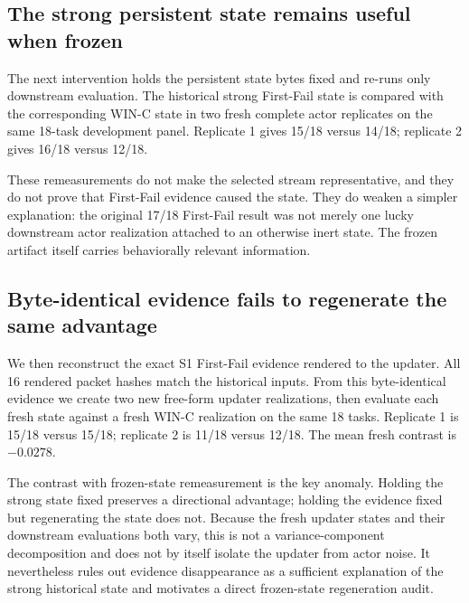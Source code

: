 \subsection{The strong persistent state remains useful when frozen}
The next intervention holds the persistent state bytes fixed and re-runs only downstream evaluation. The historical strong First-Fail state is compared with the corresponding WIN-C state in two fresh complete actor replicates on the same 18-task development panel. Replicate 1 gives 15/18 versus 14/18; replicate 2 gives 16/18 versus 12/18.

These remeasurements do not make the selected stream representative, and they do not prove that First-Fail evidence caused the state. They do weaken a simpler explanation: the original 17/18 First-Fail result was not merely one lucky downstream actor realization attached to an otherwise inert state. The frozen artifact itself carries behaviorally relevant information.

\subsection{Byte-identical evidence fails to regenerate the same advantage}
We then reconstruct the exact S1 First-Fail evidence rendered to the updater. All 16 rendered packet hashes match the historical inputs. From this byte-identical evidence we create two new free-form updater realizations, then evaluate each fresh state against a fresh WIN-C realization on the same 18 tasks. Replicate 1 is 15/18 versus 15/18; replicate 2 is 11/18 versus 12/18. The mean fresh contrast is $-0.0278$.

The contrast with frozen-state remeasurement is the key anomaly. Holding the strong state fixed preserves a directional advantage; holding the evidence fixed but regenerating the state does not. Because the fresh updater states and their downstream evaluations both vary, this is not a variance-component decomposition and does not by itself isolate the updater from actor noise. It nevertheless rules out evidence disappearance as a sufficient explanation of the strong historical state and motivates a direct frozen-state regeneration audit.

